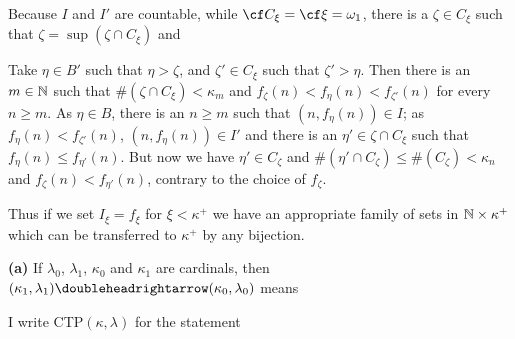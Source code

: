 {

\noindent Because $I$ and $I'$ are countable, while
$\cf C_{\xi}=\cf\xi=\omega_1$, there is a $\zeta\in C_{\xi}$ such that
$\zeta=\sup(\zeta\cap C_{\xi})$ and


\noindent Take $\eta\in B'$ such that $\eta>\zeta$, and
$\zeta'\in C_{\xi}$ such that $\zeta'>\eta$.   Then there is an
$m\in\Bbb N$ such that $\#(\zeta\cap C_{\xi})<\kappa_m$ and
$f_{\zeta}(n)<f_{\eta}(n)<f_{\zeta'}(n)$ for every $n\ge m$.   As
$\eta\in B$, there is an $n\ge m$ such that $(n,f_{\eta}(n))\in I$;  as
$f_{\eta}(n)<f_{\zeta'}(n)$, $(n,f_{\eta}(n))\in I'$ and there is an
$\eta'\in\zeta\cap C_{\xi}$ such that $f_{\eta}(n)\le f_{\eta'}(n)$.
But now we have $\eta'\in C_{\zeta}$ and
$\#(\eta'\cap C_{\zeta})\le\#(C_{\zeta})<\kappa_n$ and
$f_{\zeta}(n)<f_{\eta'}(n)$, contrary to the choice of $f_{\zeta}$.\
\Bang\Qed

Thus if we set $I_{\xi}=f_{\xi}$ for $\xi<\kappa^+$ we have an
appropriate family of sets in $\Bbb N\times\kappa^+$ which can be
transferred to $\kappa^+$ by any bijection.
}%

 {\bf (a)} 
If $\lambda_0$, $\lambda_1$, $\kappa_0$ and $\kappa_1$ are cardinals, then
$(\kappa_1,\lambda_1)\doubleheadrightarrow(\kappa_0,\lambda_0)$
means



I write CTP$(\kappa,\lambda)$ for the statement


